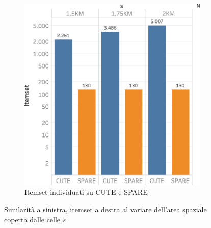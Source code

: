 \begin{figure}
\begin{subfigure}{.5\textwidth}
   \includegraphics[scale=0.6]{res/fig/sec-4/scalability/ComparisonSCUTESPARE.pdf}
  \caption{Itemset individuati su CUTE e SPARE}%
  \end{subfigure}%
  \caption{Similarità a sinistra, itemset a destra al variare dell'area spaziale coperta dalle celle \(s\)}%
  \label{fig:chap-4:CompS}
\end{figure}

